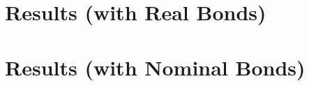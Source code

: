 \documentclass{article}
\begin{document}
%	
    \section{Results (with Real Bonds)}
    
    
    \newpage
    \section{Results (with Nominal Bonds)}
    
    
\end{document}
